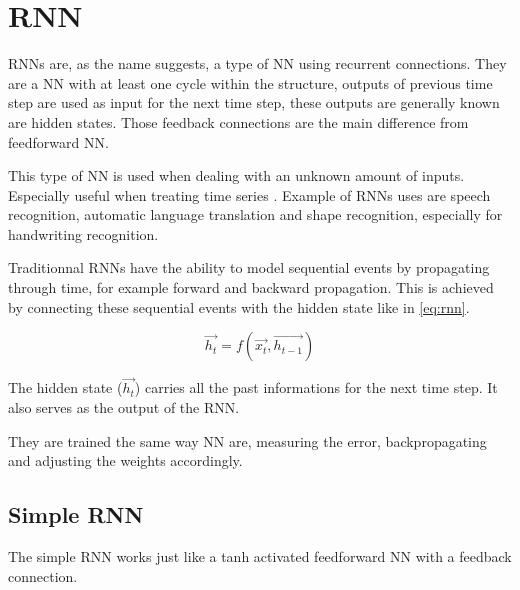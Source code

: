 \section{\acs{RNN}}\label{sec:rnn}

\acp{RNN} are, as the name suggests, a type of \ac{NN} using recurrent connections. They are a \ac{NN} with at least one cycle within the structure, outputs of previous time step are used as input for the next time step, these outputs are generally known are hidden states. Those feedback connections are the main difference from feedforward \ac{NN}.

This type of \ac{NN} is used when dealing with an unknown amount of inputs. Especially useful when treating time series \cite{rnn}. Example of \acp{RNN} uses are speech recognition, automatic language translation \cite{gru} and shape recognition, especially for handwriting recognition.

Traditionnal \acp{RNN} have the ability to model sequential events by propagating through time, for example forward and backward propagation. This is achieved by connecting these sequential events with the hidden state like in \cref{eq:rnn}.

\begin{equation}\label{eq:rnn}
  \overrightarrow{h_t}=f(\overrightarrow{x_t},\overrightarrow{h_{t-1}})
\end{equation}

The hidden state ($\overrightarrow{h_t}$) carries all the past informations for the next time step. It also serves as the output of the \ac{RNN}.

They are trained the same way \ac{NN} are, measuring the error, backpropagating and adjusting the weights accordingly.

\subsection{Simple \ac{RNN}}

The simple \ac{RNN} works just like a \ac{tanh} activated feedforward \ac{NN} with a feedback connection.

\begin{figure}[H]
  \centering
  \begin{minipage}{\columnwidth}
  \end{minipage}
  \begin{minipage}{\columnwidth}
  \end{minipage}
  \caption{}
\end{figure}

